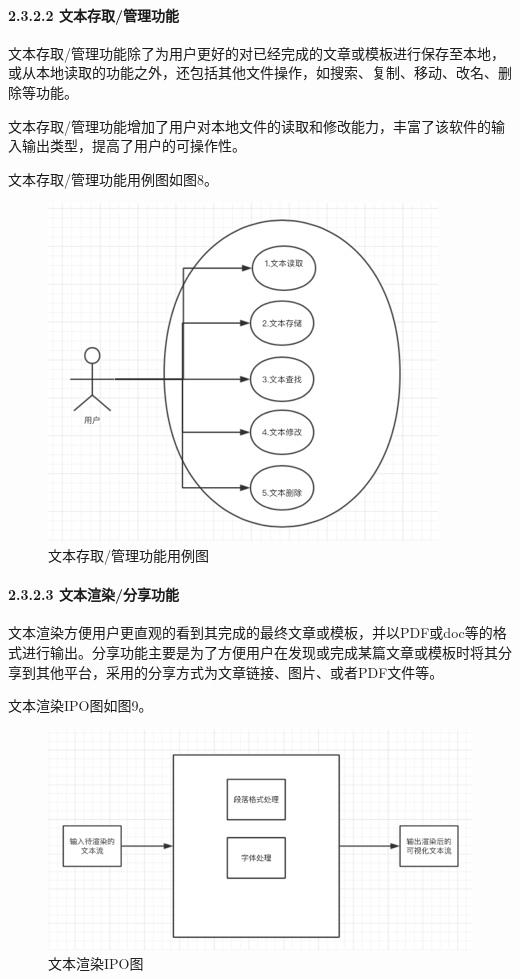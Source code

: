 \documentclass[10pt,letterpaper]{article}
\begin{document}
\paragraph{2.3.2.2 文本存取/管理功能}
\rule{0pt}{0pt} 

文本存取/管理功能除了为用户更好的对已经完成的文章或模板进行保存至本地，或从本地读取的功能之外，还包括其他文件操作，如搜索、复制、移动、改名、删除等功能。

文本存取/管理功能增加了用户对本地文件的读取和修改能力，丰富了该软件的输入输出类型，提高了用户的可操作性。

文本存取/管理功能用例图如图8。

\begin{figure}[H]
	\begin{center}
		\includegraphics[width=0.5\linewidth]{___8.png}
		\caption{文本存取/管理功能用例图}
		\label{Fig:1}
	\end{center}
	\vspace{-0.5em}
\end{figure}

\paragraph{2.3.2.3 文本渲染/分享功能}
\rule{0pt}{0pt} 

文本渲染方便用户更直观的看到其完成的最终文章或模板，并以PDF或doc等的格式进行输出。分享功能主要是为了方便用户在发现或完成某篇文章或模板时将其分享到其他平台，采用的分享方式为文章链接、图片、或者PDF文件等。

文本渲染IPO图如图9。

\begin{figure}[H]
	\begin{center}
		\includegraphics[width=0.5\linewidth]{___9.png}
		\caption{文本渲染IPO图}
		\label{Fig:1}
	\end{center}
	\vspace{-0.5em}
\end{figure}
\end{document}
